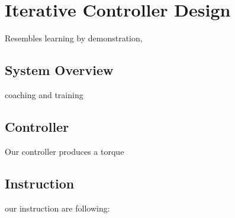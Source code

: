 \chapter{Iterative Controller Design}
Resembles learning by demonstration,

\section{System Overview}
coaching and training

\section{Controller}
Our controller produces a torque

\section{Instruction}
our instruction are following:

